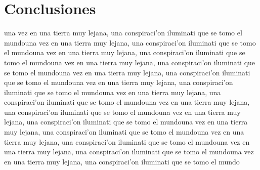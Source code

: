 \documentclass[spanish]{IEEEtran}
\begin{document}
\section{Conclusiones}
una vez en una tierra muy lejana, una conspiraci'on iluminati que se tomo el mundouna vez en una tierra muy lejana, una conspiraci'on iluminati que se tomo el mundouna vez en una tierra muy lejana, una conspiraci'on iluminati que se tomo el mundouna vez en una tierra muy lejana, una conspiraci'on iluminati que se tomo el mundouna vez en una tierra muy lejana, una conspiraci'on iluminati que se tomo el mundouna vez en una tierra muy lejana, una conspiraci'on iluminati que se tomo el mundouna vez en una tierra muy lejana, una conspiraci'on iluminati que se tomo el mundouna vez en una tierra muy lejana, una conspiraci'on iluminati que se tomo el mundouna vez en una tierra muy lejana, una conspiraci'on iluminati que se tomo el mundouna vez en una tierra muy lejana, una conspiraci'on iluminati que se tomo el mundouna vez en una tierra muy lejana, una conspiraci'on iluminati que se tomo el mundouna vez en una tierra muy lejana, una conspiraci'on iluminati que se tomo el mundouna vez en una tierra muy lejana, una conspiraci'on iluminati que se tomo el mundo

\end{document}
